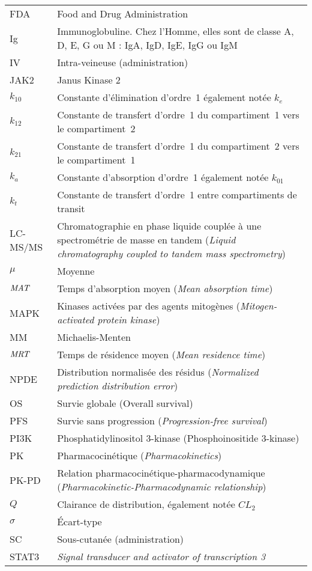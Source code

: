 \begin{tabularx}{30em}{X X}
FDA & 	Food and Drug Administration\\
Ig & 	Immunoglobuline. Chez l'Homme, elles sont de classe A, D, E, G ou M : IgA, IgD, IgE, IgG ou IgM \\
IV & 	Intra-veineuse (administration)\\
JAK2 & 	Janus Kinase 2\\
$k_{10}$ & 	Constante d'élimination d'ordre~1 également notée $k_e$\\
$k_{12}$ & 	Constante de transfert d'ordre~1 du compartiment~1 vers le compartiment~2\\
$k_{21}$ & 	Constante de transfert d'ordre~1 du compartiment~2 vers le compartiment~1\\
$k_a$ & 	Constante d'absorption d'ordre~1 également notée $k_{01}$\\
$k_t$ & 	Constante de transfert d'ordre~1 entre compartiments de transit\\
LC-MS/MS & 	Chromatographie en phase liquide couplée à une spectrométrie de masse en tandem (\textit{Liquid chromatography coupled to tandem mass spectrometry})\\
$\mu$ & 	Moyenne\\
$\operatorname{\textit{MAT}}$ & 	Temps d'absorption moyen (\textit{Mean absorption time})\\
MAPK & 	Kinases activées par des agents mitogènes (\textit{Mitogen-activated protein kinase})\\
MM & 	Michaelis-Menten\\
$\operatorname{\textit{MRT}}$ & 	Temps de résidence moyen (\textit{Mean residence time})\\
NPDE & 	Distribution normalisée des résidus (\textit{Normalized prediction distribution error})\\
OS & 	Survie globale (Overall survival)\\
PFS & 	Survie sans progression (\textit{Progression-free survival})\\
PI3K & 	Phosphatidylinositol 3-kinase (Phosphoinositide 3-kinase)\\
PK & 	Pharmacocinétique (\textit{Pharmacokinetics})\\
PK-PD & 	Relation pharmacocinétique-pharmacodynamique (\textit{Pharmacokinetic-Pharmacodynamic relationship})\\
$Q$ & 	Clairance de distribution, également notée $CL_2$\\
$\sigma$ & 	Écart-type\\
SC & 	Sous-cutanée (administration)\\
STAT3 & 	\textit{Signal transducer and activator of transcription 3}\\

\end{tabularx}

